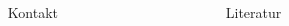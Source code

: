 \documentclass[final,hyperref={pdfpagelabels=false}]{beamer}
\begin{document}
\begin{frame}[t]
\begin{columns}[t] %

\begin{column}{.025\textwidth}\end{column} %

\begin{column}{.465\textwidth} %


\begin{block}{Kontakt}

\end{block}

\end{column} %

\begin{column}{.025\textwidth}\end{column} %

\begin{column}{.465\textwidth}

\begin{block}{Literatur}
  
  \nocite{pries:19}
 
\end{block}







\end{column}

\begin{column}{.025\textwidth}\end{column} %

\end{columns} %









\nocite{*}

%  

\end{frame} %
\end{document}
